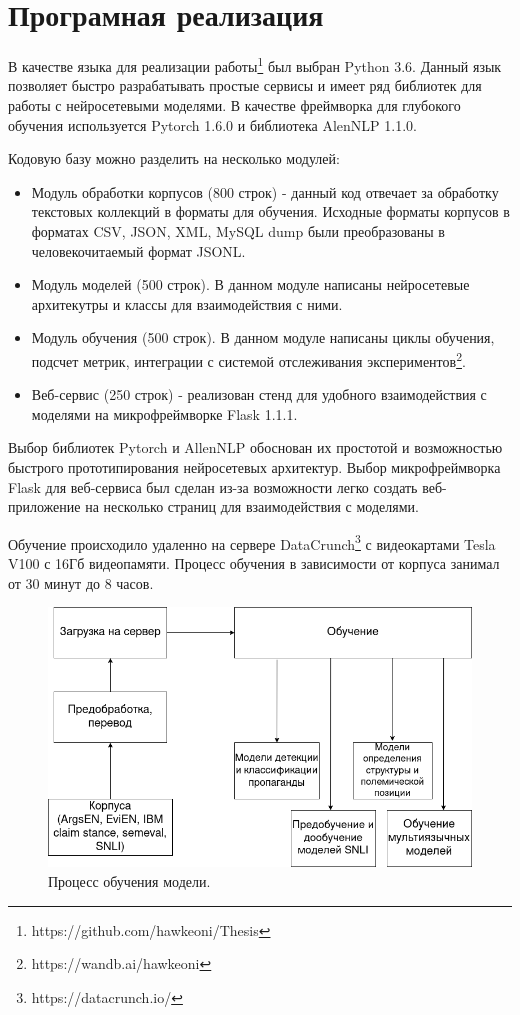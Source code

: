 \section{Програмная реализация}
В качестве языка для реализации работы\footnote{https://github.com/hawkeoni/Thesis} был выбран Python 3.6. Данный язык позволяет быстро разрабатывать простые сервисы и имеет ряд библиотек для работы с нейросетевыми моделями. В качестве фреймворка для глубокого обучения используется Pytorch 1.6.0 и библиотека AlenNLP 1.1.0.

Кодовую базу можно разделить на несколько модулей:

\begin{itemize}
    \item Модуль обработки корпусов (800 строк) - данный код отвечает за обработку текстовых коллекций в форматы для обучения. Исходные форматы корпусов в форматах CSV, JSON, XML, MySQL dump были преобразованы в человекочитаемый формат JSONL.
    \item Модуль моделей (500 строк). В данном модуле написаны нейросетевые архитекутры и классы для взаимодействия с ними.
    \item Модуль обучения (500 строк). В данном модуле написаны циклы обучения, подсчет метрик, интеграции с системой отслеживания экспериментов\footnote{https://wandb.ai/hawkeoni}.
    \item Веб-сервис (250 строк) - реализован стенд для удобного взаимодействия с моделями на микрофреймворке Flask 1.1.1.
\end{itemize}

Выбор библиотек Pytorch и AllenNLP обоснован их простотой и возможностью быстрого прототипирования нейросетевых архитектур. Выбор микрофреймворка Flask для веб-сервиса был сделан из-за возможности легко создать веб-приложение на несколько страниц для взаимодействия с моделями.

Обучение происходило удаленно на сервере DataCrunch\footnote{https://datacrunch.io/} с видеокартами Tesla V100 с 16Гб видеопамяти. Процесс обучения в зависимости от корпуса занимал от 30 минут до 8 часов.

\begin{figure}[h!]
\centering
\includegraphics[scale=.5]{Комплекс.png}
\caption{Процесс обучения модели.}
\label{Problem_Picture}
\end{figure}


